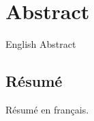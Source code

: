 \cleardoublepage
\chapter*{Abstract}

English Abstract


\cleardoublepage

\begin{otherlanguage}{french}
\chapter*{Résumé}

Résumé en français.
\end{otherlanguage}
